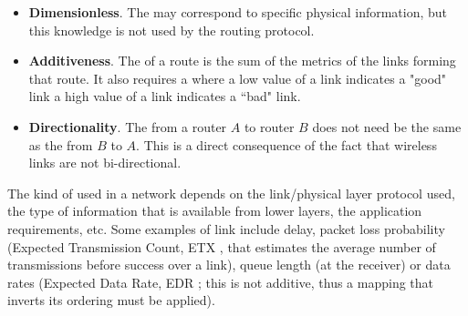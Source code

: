 \begin{itemize}
\item {\bf Dimensionless}. The  may correspond to specific physical information, but this knowledge is not used by the routing protocol. 
\item {\bf Additiveness}. The  of a route is the sum of the metrics of the links forming that route. It also requires a  where a low value of a link  indicates a "good" link a high value of a link  indicates a ``bad" link. 
\item {\bf Directionality}. The  from a router $A$ to router $B$ does not need be the same as the  from $B$ to $A$. This is a direct consequence of the fact that wireless links are not bi-directional. 
\end{itemize}

The kind of  used in a network depends on the link/physical layer protocol used, the type of information that is available from lower layers, the application requirements, etc. Some examples of link  include delay, packet loss probability (Expected Transmission Count, ETX \cite{etx}, that estimates the average number of transmissions before success over a link), queue length (at the receiver) or data rates (Expected Data Rate, EDR \cite{edr}; this  is not additive, thus a mapping that inverts its ordering must be applied).


